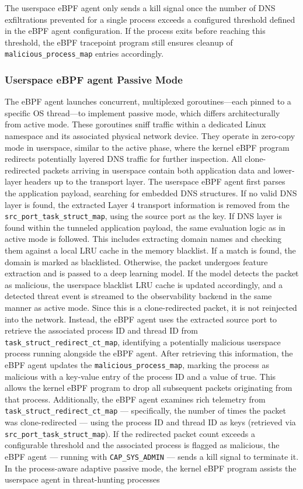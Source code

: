 \documentclass [11pt, proquest] {uwthesis}[2020/02/24]
\begin{document}
The userspace eBPF agent only sends a kill signal once the number of DNS exfiltrations prevented for a single process exceeds a configured threshold defined in the eBPF agent configuration. If the process exits before reaching this threshold, the eBPF tracepoint program still ensures cleanup of \texttt{malicious\_process\_map} entries accordingly.

\subsubsection{\textbf{Userspace eBPF agent Passive Mode}}
\label{passive:sec2}
The eBPF agent launches concurrent, multiplexed goroutines—each pinned to a specific OS thread—to implement passive mode, which differs architecturally from active mode. These goroutines sniff traffic within a dedicated Linux namespace and its associated physical network device. They operate in zero-copy mode in userspace, similar to the active phase, where the kernel eBPF program redirects potentially layered DNS traffic for further inspection. All clone-redirected packets arriving in userspace contain both application data and lower-layer headers up to the transport layer. The userspace eBPF agent first parses the application payload, searching for embedded DNS structures. If no valid DNS layer is found, the extracted Layer 4 transport information is removed from the \texttt{src\_port\_task\_struct\_map}, using the source port as the key. If DNS layer is found within the tunneled application payload, the same evaluation logic as in active mode is followed. This includes extracting domain names and checking them against a local LRU cache in the memory blacklist. If a match is found, the domain is marked as blacklisted. Otherwise, the packet undergoes feature extraction and is passed to a deep learning model. If the model detects the packet as malicious, the userspace blacklist LRU cache is updated accordingly, and a detected threat event is streamed to the observability backend in the same manner as active mode. Since this is a clone-redirected packet, it is not reinjected into the network. Instead, the eBPF agent uses the extracted source port to retrieve the associated process ID and thread ID from \texttt{task\_struct\_redirect\_ct\_map}, identifying a potentially malicious userspace process running alongside the eBPF agent. After retrieving this information, the eBPF agent updates the \texttt{malicious\_process\_map}, marking the process as malicious with a key-value entry of the process ID and a value of true. This allows the kernel eBPF program to drop all subsequent packets originating from that process. Additionally, the eBPF agent examines rich telemetry from \texttt{task\_struct\_redirect\_ct\_map} — specifically, the number of times the packet was clone-redirected — using the process ID and thread ID as keys (retrieved via \texttt{src\_port\_task\_struct\_map}). If the redirected packet count exceeds a configurable threshold and the associated process is flagged as malicious, the eBPF agent — running with \texttt{CAP\_SYS\_ADMIN} — sends a kill signal to terminate it. In the process-aware adaptive passive mode, the kernel eBPF program assists the userspace agent in threat-hunting processes 
\end{document}
